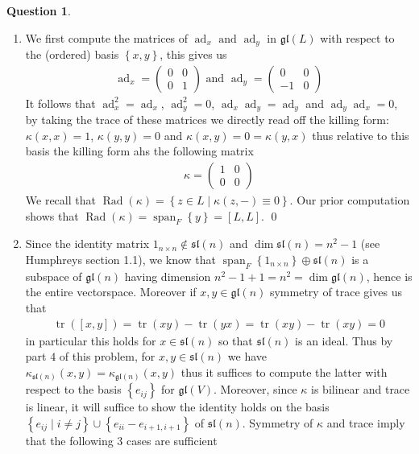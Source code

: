 \documentclass[10.5pt]{article}
\theoremstyle{definition}
\newtheorem{pb}{Question}
\numberwithin{example}{subsection}
\numberwithin{proposition}{subsection}
\newcommand{\set}[1]{\left\{#1\right\}}
\newcommand{\tand}{\text{ and }}
\begin{document}
    \begin{pb}
        \begin{enumerate}
            \item We first compute the matrices of \(\operatorname{ad}_x \tand \operatorname{ad}_y\) in \(\mathfrak{gl}(L)\) with respect to the (ordered) basis \(\set{x,y}\), this gives us
            \begin{align}
                \operatorname{ad}_x = \begin{pmatrix} 0 & 0 \\ 0 & 1 \end{pmatrix} \tand \operatorname{ad}_y = \begin{pmatrix} 0 & 0 \\ -1 & 0 \end{pmatrix}
            \end{align}
            It follows that \(\operatorname{ad}_x^2 = \operatorname{ad}_x\), \(\operatorname{ad}_y^2 = 0\), \(\operatorname{ad}_x \operatorname{ad}_y = \operatorname{ad}_y\) and \(\operatorname{ad}_y \operatorname{ad}_x = 0\), by taking the trace of these matrices we directly read off the killing form: \(\kappa(x,x) = 1\), \(\kappa(y,y) = 0\) and \(\kappa(x,y) = 0 = \kappa(y,x)\) thus relative to this basis the killing form ahs the following matrix
            \begin{align}
                \kappa = \begin{pmatrix} 1 & 0 \\ 0 & 0 \end{pmatrix}
            \end{align}
            We recall that \(\operatorname{Rad}(\kappa) = \set{z \in L \mid \kappa(z,-) \equiv 0}\). Our prior computation shows that \(\operatorname{Rad}(\kappa) = \operatorname{span}_F\set{y} = [L,L]\). \qed

            \item Since the identity matrix \(1_{n\times n} \not \in \mathfrak{sl}(n)\) and \(\dim \mathfrak{sl}(n) = n^2 - 1\) (see Humphreys section 1.1), we know that \(\operatorname{span}_F\set{1_{n\times n}} \oplus \mathfrak{sl}(n)\) is a subspace of \(\mathfrak{gl}(n)\) having dimension \(n^2 - 1 + 1 = n^2 = \dim \mathfrak{gl}(n)\), hence is the entire vectorspace. Moreover if \(x,y \in \mathfrak{gl}(n)\) symmetry of trace gives us that 
            \begin{align}
                \operatorname{tr}([x,y]) = \operatorname{tr}(xy) - \operatorname{tr}(yx) = \operatorname{tr}(xy) -\operatorname{tr}(xy) = 0
            \end{align}
            in particular this holds for \(x \in \mathfrak{sl}(n)\) so that \(\mathfrak{sl}(n)\) is an ideal. Thus by part \(4\) of this problem, for \(x,y \in \mathfrak{sl}(n)\) we have \(\kappa_{\mathfrak{sl}(n)}(x,y) = \kappa_{\mathfrak{gl}(n)}(x,y)\) thus it suffices to compute the latter with respect to the basis \(\set{e_{ij}}\) for \(\mathfrak{gl}(V)\). Moreover, since \(\kappa\) is bilinear and trace is linear, it will suffice to show the identity holds on the basis \(\set{e_{ij}\mid i \neq j} \cup \set{e_{ii} - e_{i+1,i+1}}\) of \(\mathfrak{sl}(n)\). Symmetry of \(\kappa\) and trace imply that the following 3 cases are sufficient


\end{enumerate}
\end{pb}
\end{document}

